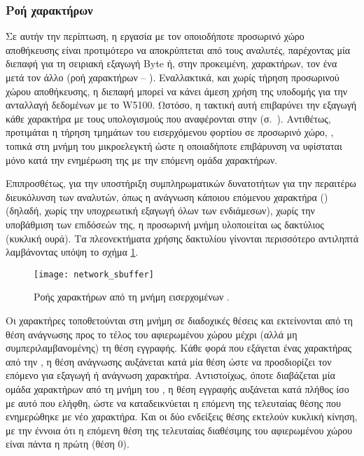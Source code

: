 \subsubsection{Ροή χαρακτήρων}

Σε αυτήν την περίπτωση, η εργασία με τον οποιοδήποτε προσωρινό χώρο αποθήκευσης
είναι προτιμότερο να αποκρύπτεται από τους αναλυτές, παρέχοντας μία διεπαφή για
τη σειριακή εξαγωγή Byte ή, στην προκειμένη, χαρακτήρων, τον ένα μετά τον άλλο
(ροή χαρακτήρων -- ).
Εναλλακτικά, και χωρίς τήρηση προσωρινού χώρου αποθήκευσης, η διεπαφή μπορεί να
κάνει άμεση χρήση της υποδομής για την ανταλλαγή δεδομένων με το W5100. Ωστόσο,
η τακτική αυτή επιβαρύνει την εξαγωγή κάθε χαρακτήρα με τους υπολογισμούς που
αναφέρονται στην 
(σ.~\pageref{ssubsec:network:rx-tx-buffer}). Αντιθέτως, προτιμάται η τήρηση
τμημάτων του εισερχόμενου φορτίου σε προσωρινό χώρο, , τοπικά στη
μνήμη του μικροελεγκτή ώστε η οποιαδήποτε επιβάρυνση να υφίσταται μόνο κατά την
ενημέρωση της  με την επόμενη ομάδα χαρακτήρων.

Επιπροσθέτως, για την υποστήριξη συμπληρωματικών δυνατοτήτων για την περαιτέρω
διευκόλυνση των αναλυτών, όπως η ανάγνωση κάποιου επόμενου χαρακτήρα () (δηλαδή, χωρίς την υποχρεωτική εξαγωγή όλων των ενδιάμεσων), χωρίς την
υποβάθμιση των επιδόσεών της, η προσωρινή μνήμη υλοποιείται ως δακτύλιος
(κυκλική ουρά). Τα πλεονεκτήματα χρήσης δακτυλίου γίνονται περισσότερο αντιληπτά
λαμβάνοντας υπόψη το σχήμα \ref{fig:network:sbuffer}.

\begin{figure}
    \caption{Ροής χαρακτήρων από τη μνήμη εισερχομένων .
    \label{fig:network:sbuffer}}
    \begin{center}
    \texttt{[image: network\_sbuffer]}
    \end{center}
\end{figure}

Οι χαρακτήρες τοποθετούνται στη μνήμη  σε διαδοχικές θέσεις και
εκτείνονται από τη θέση ανάγνωσης προς το τέλος του αφιερωμένου χώρου μέχρι
(αλλά μη συμπεριλαμβανομένης) τη θέση εγγραφής. Κάθε φορά που εξάγεται ένας
χαρακτήρας από την , η θέση ανάγνωσης αυξάνεται κατά μία θέση ώστε να
προσδιορίζει τον επόμενο για εξαγωγή ή ανάγνωση χαρακτήρα. Αντιστοίχως, όποτε
διαβάζεται μία ομάδα χαρακτήρων από τη μνήμη του , η θέση εγγραφής
αυξάνεται κατά πλήθος ίσο με αυτό που ελήφθη, ώστε να καταδεικνύεται η επόμενη
της τελευταίας θέσης που ενημερώθηκε με νέο χαρακτήρα. Και οι δύο ενδείξεις
θέσης εκτελούν κυκλική κίνηση, με την έννοια ότι η επόμενη θέση της τελευταίας
διαθέσιμης του αφιερωμένου χώρου είναι πάντα η πρώτη (θέση 0).

